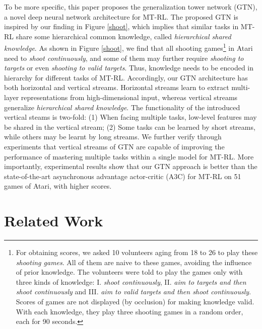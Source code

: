 \documentclass[letterpaper]{article} %
\begin{document}
To be more specific, this paper proposes the generalization tower network (GTN), a novel deep neural network architecture for MT-RL.
The proposed GTN is inspired by our finding in Figure \ref{shoot}, which implies that similar tasks in MT-RL share some hierarchical common knowledge, called \textit{hierarchical shared knowledge}.
As shown in Figure \ref{shoot}, we find that all shooting games\footnote{For obtaining scores, we asked 10 volunteers aging from 18 to 26 to play these \textit{shooting games}. All of them are naive to these games, avoiding the influence of prior knowledge. The volunteers were told to play the games only with three kinds of knowledge: I. \textit{shoot continuously}, II. \textit{aim to targets and then shoot continuously} and III. \textit{aim to valid targets and then shoot continuously}. Scores of games are not displayed (by occlusion) for making knowledge valid.  With each knowledge, they play three shooting games in a random order, each for 90 seconds.} in Atari \cite{bellemare2013arcade,1606.01540} need to \textit{shoot continuously}, and some of them may further require \textit{shooting to targets} or even \textit{shooting to valid targets}.
Thus, knowledge needs to be encoded in hierarchy for different tasks of MT-RL.
Accordingly, our GTN architecture has both horizontal and vertical streams.
Horizontal streams learn to extract multi-layer representations from high-dimensional input, whereas vertical streams generalize \textit{hierarchical shared knowledge}.
The functionality of the introduced vertical steams is two-fold: (1) When facing multiple tasks, low-level features may be shared in the vertical stream; (2) Some tasks can be learned by short streams, while others may be learnt by long streams.
We further verify through experiments that vertical streams of GTN are capable of improving the performance of mastering multiple tasks within a single model for MT-RL.
More importantly, experimental results show that our GTN approach is better than the state-of-the-art asynchronous advantage actor-critic (A3C) for MT-RL \cite{romoff2016deep} on 51 games of Atari, with higher scores.

\section{Related Work}
\label{Related Work}
\end{document}
